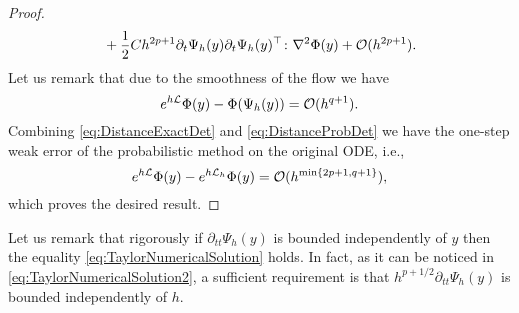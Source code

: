 \documentclass[10pt]{article}
\begin{document}
\begin{proof}
\begin{equation}
\begin{aligned}
			&\quad +\frac{1}{2}Ch^{2p+1}\partial_t \Psi_h(y) \partial_t \Psi_h(y)^\top  \colon \nabla^2\Phi(y) + \mathcal{O}(h^{2p+1}).
		\end{aligned}
	\end{equation}
	Let us remark that due to the smoothness of the flow we have
	\begin{equation}\label{eq:DistanceExactDet}
		e^{h\mathcal{L}}\Phi(y) - \Phi(\Psi_h(y)) = \mathcal{O}(h^{q+1}).
	\end{equation}
	Combining \eqref{eq:DistanceExactDet} and \eqref{eq:DistanceProbDet} we have the one-step weak error of the probabilistic method on the original ODE, i.e., 
	\begin{equation}\label{eq:LocalWeakError}
		e^{h\mathcal{L}}\Phi(y) - e^{h\mathcal{L}_h}\Phi(y) = \mathcal{O}(h^{\min\{2p+1, q+1\}}),
	\end{equation}
	which proves the desired result.
\end{proof}

\begin{remark} Let us remark that rigorously if $\partial_{tt}\Psi_h(y)$ is bounded independently of $y$ then the equality \eqref{eq:TaylorNumericalSolution} holds. In fact, as it can be noticed in \eqref{eq:TaylorNumericalSolution2}, a sufficient requirement is that $h^{p+1/2}\partial_{tt}\Psi_h(y)$ is bounded independently of $h$. 
\end{remark}
\end{document}
